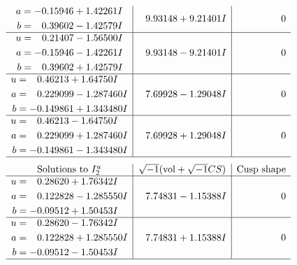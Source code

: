 \documentclass[1p]{elsarticle_modified}
\theoremstyle{definition}
\newcommand{\I}{\sqrt{-1}}
\begin{document}
$$\begin{array}{c|c|c}
\begin{aligned}
a &= -0.15946 + 1.42261 I \\
b &= \phantom{-}0.39602 - 1.42579 I\end{aligned}
 & \phantom{-}9.93148 + 9.21401 I & \phantom{-0.000000 } 0 \\ \hline\begin{aligned}
u &= \phantom{-}0.21407 - 1.56500 I \\
a &= -0.15946 - 1.42261 I \\
b &= \phantom{-}0.39602 + 1.42579 I\end{aligned}
 & \phantom{-}9.93148 - 9.21401 I & \phantom{-0.000000 } 0 \\ \hline\begin{aligned}
u &= \phantom{-}0.46213 + 1.64750 I \\
a &= \phantom{-}0.229099 - 1.287460 I \\
b &= -0.149861 + 1.343480 I\end{aligned}
 & \phantom{-}7.69928 - 1.29048 I & \phantom{-0.000000 } 0 \\ \hline\begin{aligned}
u &= \phantom{-}0.46213 - 1.64750 I \\
a &= \phantom{-}0.229099 + 1.287460 I \\
b &= -0.149861 - 1.343480 I\end{aligned}
 & \phantom{-}7.69928 + 1.29048 I & \phantom{-0.000000 } 0\\
 \hline 
 \end{array}$$\newpage$$\begin{array}{c|c|c}  
\text{Solutions to }I^u_{2}& \I (\text{vol} + \sqrt{-1}CS) & \text{Cusp shape}\\
 \hline 
\begin{aligned}
u &= \phantom{-}0.28620 + 1.76342 I \\
a &= \phantom{-}0.122828 - 1.285550 I \\
b &= -0.09512 + 1.50453 I\end{aligned}
 & \phantom{-}7.74831 - 1.15388 I & \phantom{-0.000000 } 0 \\ \hline\begin{aligned}
u &= \phantom{-}0.28620 - 1.76342 I \\
a &= \phantom{-}0.122828 + 1.285550 I \\
b &= -0.09512 - 1.50453 I\end{aligned}
 & \phantom{-}7.74831 + 1.15388 I & \phantom{-0.000000 } 0\\
 \hline 
 \end{array}$$\newpage\newpage\renewcommand{\arraystretch}{1}
\end{document}
